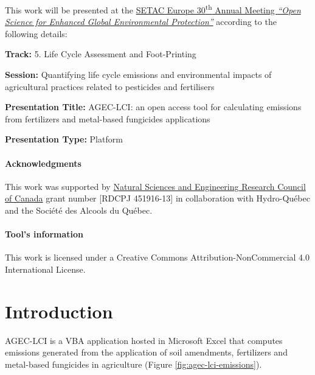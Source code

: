 \documentclass[openany]{book}
\begin{document}
This work will be presented at the \href{https://dublin.setac.org/}{SETAC Europe 30\textsuperscript{th} Annual Meeting \emph{``Open Science for Enhanced Global Environmental Protection''}} according to the following details:

\textbf{Track:} 5. Life Cycle Assessment and Foot-Printing

\textbf{Session:} Quantifying life cycle emissions and environmental impacts of agricultural practices related to pesticides and fertilisers

\textbf{Presentation Title:} AGEC-LCI: an open access tool for calculating emissions from fertilizers and metal-based fungicides applications

\textbf{Presentation Type:} Platform

\hypertarget{acknowledgments}{%
\subsubsection*{Acknowledgments}\label{acknowledgments}}

This work was supported by \href{https://www.nserc-crsng.gc.ca/index_eng.asp}{Natural Sciences and Engineering Research Council of Canada} grant number {[}RDCPJ 451916-13{]} in collaboration with Hydro-Québec and the Société des Alcools du Québec.

\hypertarget{tools-information}{%
\subsubsection*{Tool's information}\label{tools-information}}

This work is licensed under a Creative Commons Attribution-NonCommercial 4.0 International License.

\hypertarget{introduction}{%
\chapter{Introduction}\label{introduction}}

AGEC-LCI is a VBA application hosted in Microsoft Excel that computes emissions generated from the application of soil amendments, fertilizers and metal-based fungicides in agriculture (Figure \ref{fig:agec-lci-emissions}).
\end{document}
